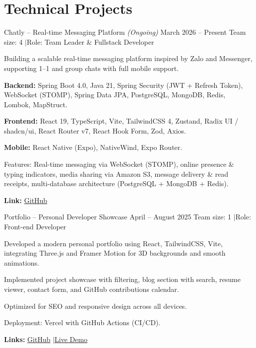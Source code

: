 \section{Technical Projects}

\projectEntry
    {Chatly -- Real-time Messaging Platform \normalfont\textit{(Ongoing)}}
    {March 2026 -- Present}
    {Team size: 4 \enspace$\vert$\enspace Role: Team Leader \& Fullstack Developer}

\begin{entryItems}
    \item Building a scalable real-time messaging platform inspired by Zalo and Messenger, supporting 1--1 and group chats with full mobile support.
    \item \textbf{Backend:} Spring Boot 4.0, Java 21, Spring Security (JWT + Refresh Token), WebSocket (STOMP), Spring Data JPA, PostgreSQL, MongoDB, Redis, Lombok, MapStruct.
    \item \textbf{Frontend:} React 19, TypeScript, Vite, TailwindCSS 4, Zustand, Radix UI / shadcn/ui, React Router v7, React Hook Form, Zod, Axios.
    \item \textbf{Mobile:} React Native (Expo), NativeWind, Expo Router.
    \item Features: Real-time messaging via WebSocket (STOMP), online presence \& typing indicators, media sharing via Amazon S3, message delivery \& read receipts, multi-database architecture (PostgreSQL + MongoDB + Redis).
    \item \textbf{Link:} \href{https://github.com/giasinguyen/chatly-messaging-platform}{GitHub}
\end{entryItems}

\vspace{4pt}

\projectEntry
    {Portfolio -- Personal Developer Showcase}
    {April -- August 2025}
    {Team size: 1 \enspace$\vert$\enspace Role: Front-end Developer}

\begin{entryItems}
    \item Developed a modern personal portfolio using React, TailwindCSS, Vite, integrating Three.js and Framer Motion for 3D backgrounds and smooth animations.
    \item Implemented project showcase with filtering, blog section with search, resume viewer, contact form, and GitHub contributions calendar.
    \item Optimized for SEO and responsive design across all devices.
    \item Deployment: Vercel with GitHub Actions (CI/CD).
    \item \textbf{Links:} \href{https://github.com/giasinguyen/giasi-dev-portfolio}{GitHub} \enspace$\vert$\enspace \href{https://nguyentrangiasi.id.vn}{Live Demo}
\end{entryItems}

